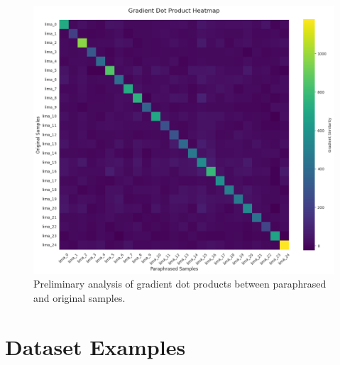 \begin{figure}[ht]
    \centering
    \includegraphics[width=1\textwidth]{figures/preliminary_analysis_dot_products.png}
    \caption{Preliminary analysis of gradient dot products between paraphrased and original samples.}
    \label{fig:preliminary_analysis_dot_products}
\end{figure}

\section{Dataset Examples}

